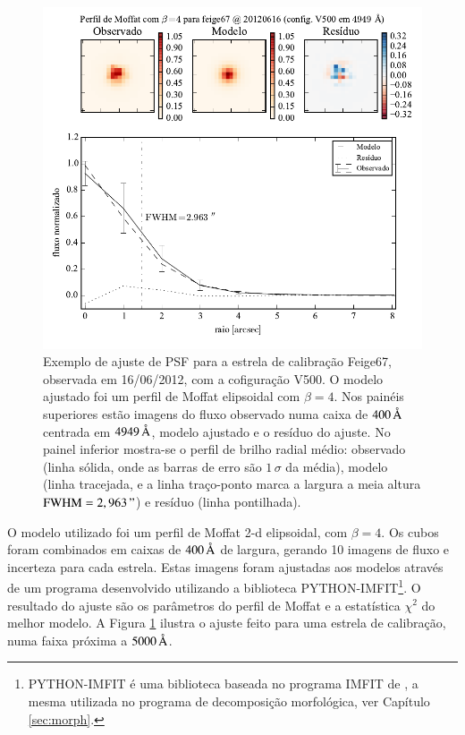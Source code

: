 \begin{figure}
	\includegraphics{figuras/PSFMoffatBeta4_exemplo}
	\caption[Exemplo de ajuste de PSF para estrela de calibração.]
	{Exemplo de ajuste de PSF para a estrela de calibração Feige67, observada em
	16/06/2012, com a cofiguração V500. O modelo ajustado foi um perfil de
	Moffat elipsoidal com $\beta=4$. Nos painéis superiores estão imagens do fluxo
	observado numa caixa de $400\,\text{\normalfont\AA}$ centrada em $4949\,\text{\normalfont\AA}$, modelo
	ajustado e o resíduo do ajuste. No painel inferior mostra-se o perfil de brilho
	radial médio: observado (linha sólida, onde as barras de erro são $1\,\sigma$
	da média), modelo (linha tracejada, e a linha traço-ponto marca a largura a
	meia altura $\mathrm{FWHM}=2,963\,"$) e resíduo (linha pontilhada).}
	\label{fig:PSFExemplo}
\end{figure}

O modelo utilizado foi um perfil de Moffat 2-d elipsoidal, com $\beta = 4$. Os
cubos foram combinados em caixas de $400\,\text{\normalfont\AA}$ de largura, gerando 10
imagens de fluxo e incerteza para cada estrela. Estas imagens foram ajustadas
aos modelos através de um programa desenvolvido utilizando a biblioteca
PYTHON-IMFIT\footnote{PYTHON-IMFIT é uma biblioteca baseada no programa IMFIT de
\citet{Erwin2015}, a mesma utilizada no programa de decomposição morfológica,
ver Capítulo \ref{sec:morph}.}. O resultado do ajuste são os parâmetros do
perfil de Moffat e a estatística $\chi^2$ do melhor modelo. A Figura
\ref{fig:PSFExemplo} ilustra o ajuste feito para uma estrela de calibração, numa
faixa próxima a $5000\,\text{\normalfont\AA}$.

